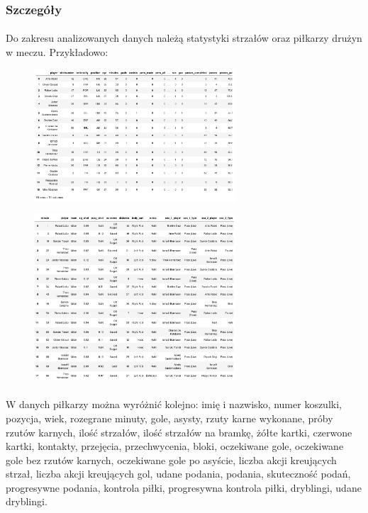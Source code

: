 \documentclass[12pt, letterpaper]{article}
\begin{document}
\subsubsection{Szczegóły}
\paragraph{} Do zakresu analizowanych danych należą statystyki strzałów oraz piłkarzy drużyn w meczu. Przykładowo: \pagebreak
\begin{figure}[ht]
    \centering
    \includegraphics[width=0.67\textwidth]{images/example_players.png}
\end{figure}
\begin{figure}[ht]
    \centering
    \includegraphics[width=0.67\textwidth]{images/example_shots.png}
\end{figure}
\paragraph{} W danych piłkarzy można wyróżnić kolejno: imię i nazwisko, numer koszulki, pozycja, wiek, rozegrane minuty, gole, asysty, rzuty karne wykonane, próby rzutów karnych, ilość strzałów, ilość strzałów na bramkę, żółte kartki, czerwone kartki, kontakty, przejęcia, przechwycenia, bloki, oczekiwane gole, oczekiwane gole bez rzutów karnych, oczekiwane gole po asyście, liczba akcji kreujących strzał, liczba akcji kreujących gol, udane podania, podania, skuteczność podań, progresywne podania, kontrola piłki, progresywna kontrola piłki, dryblingi, udane dryblingi.
\end{document}
